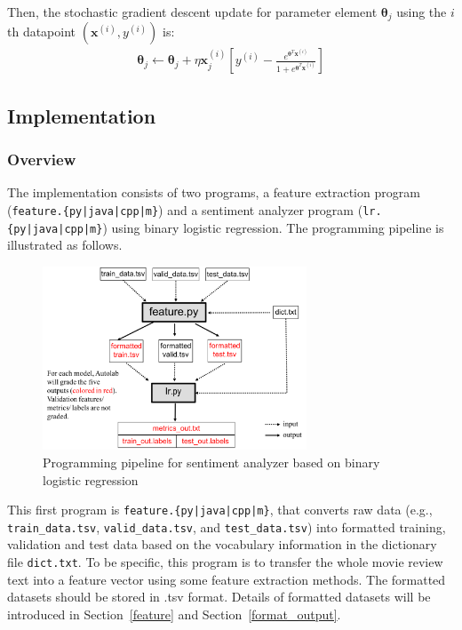\documentclass[11pt]{article}
\numberwithin{equation}{section} %
\numberwithin{figure}{section} %
\numberwithin{table}{section} %
\def\x{\mathbf x}
\newcommand{\thetav     }{\boldsymbol \theta     }
\begin{document}
Then, the stochastic gradient descent update for  parameter element $\thetav_j$ using the $i$th datapoint $(\x^{(i)},y^{(i)})$ is:
\begin{align}
    \thetav_j \leftarrow \thetav_j + \eta \x_j^{\left(i\right)}\left[y^{(i)}-\frac{e^{\thetav^T\x^{\left(i\right)}}}{1+e^{\thetav^T\x^{\left(i\right)}}}\right]
\end{align}
 


\subsection{Implementation}

\subsubsection{Overview}\label{overview}

The implementation consists of two programs, a feature extraction program (\texttt{feature.\{py|java|cpp|m\}}) and a sentiment analyzer program (\texttt{lr.\{py|java|cpp|m\}}) using binary logistic regression. The programming pipeline is illustrated as follows.

\begin{figure}[H]
        \centering
        \includegraphics[width = 0.7\textwidth]{Pipeline.png}
        \caption{Programming pipeline for sentiment analyzer based on binary logistic regression}
        \label{pipeline}
\end{figure}


This first program is \texttt{feature.\{py|java|cpp|m\}}, that converts raw data (e.g., \lstinline{train_data.tsv}, \lstinline{valid_data.tsv}, and \lstinline{test_data.tsv}) into formatted training, validation and test data based on the vocabulary information in the dictionary file \lstinline{dict.txt}. To be specific, this program is to transfer the whole movie review text into a feature vector using some feature extraction methods. The formatted datasets should be stored in .tsv format. Details of formatted datasets will be introduced in Section~\ref{feature} and Section~\ref{format_output}.
\end{document}

